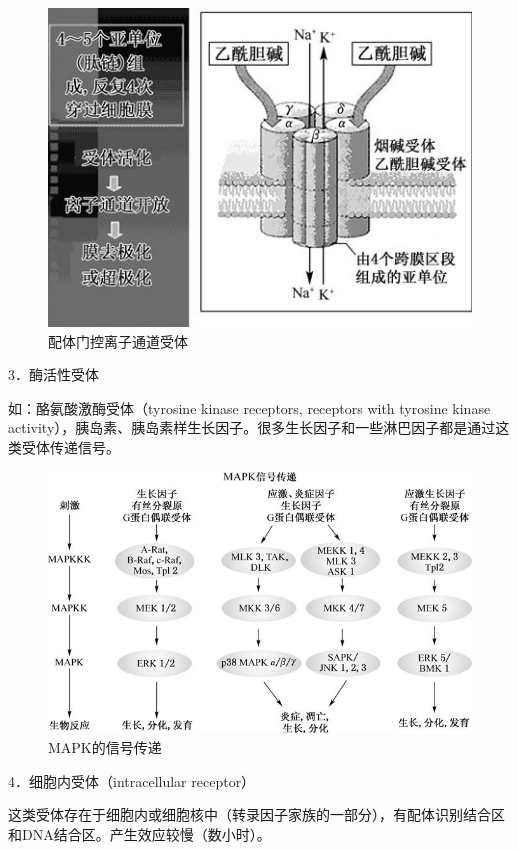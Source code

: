 \begin{figure}[!htbp]
 \centering
 \includegraphics{./images/Image00020.jpg}
 \captionsetup{justification=centering}
 \caption{配体门控离子通道受体}
 \label{fig2-11}
  \end{figure} 

3．酶活性受体

如：酪氨酸激酶受体（tyrosine kinase receptors, receptors with tyrosine
kinase
activity），胰岛素、胰岛素样生长因子。很多生长因子和一些淋巴因子都是通过这类受体传递信号。

\begin{figure}[!htbp]
 \centering
 \includegraphics{./images/Image00021.jpg}
 \captionsetup{justification=centering}
 \caption{MAPK的信号传递}
 \label{fig2-12}
  \end{figure} 

4．细胞内受体（intracellular receptor）

这类受体存在于细胞内或细胞核中（转录因子家族的一部分），有配体识别结合区和DNA结合区。产生效应较慢（数小时）。

